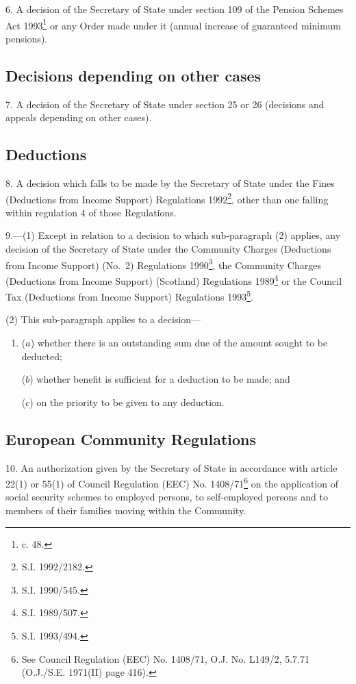 \documentclass[12pt,a4paper]{article}
\begin{document}
6.  A decision of the Secretary of State under section 109 of the Pension Schemes Act 1993\footnote{ c. 48.} or any Order made under it (annual increase of guaranteed minimum pensions).

\subsection*{Decisions depending on other cases}

7.  A decision of the Secretary of State under section 25 or 26 (decisions and appeals depending on other cases).

\subsection*{Deductions}

8.  A decision which falls to be made by the Secretary of State under the Fines (Deductions from Income Support) Regulations 1992\footnote{\frenchspacing S.I. 1992/2182.}, other than one falling within regulation 4 of those Regulations.

\medskip

9.—(1) Except in relation to a decision to which sub-paragraph (2) applies, any decision of the Secretary of State under the Community Charges (Deductions from Income Support) (No.\ 2) Regulations 1990\footnote{\frenchspacing S.I. 1990/545.}, the Community Charges (Deductions from Income Support) (Scotland) Regulations 1989\footnote{\frenchspacing S.I. 1989/507.} or the Council Tax (Deductions from Income Support) Regulations 1993\footnote{\frenchspacing S.I. 1993/494.}.

(2) This sub-paragraph applies to a decision—
\begin{enumerate}\item[]
($a$) whether there is an outstanding sum due of the amount sought to be deducted;

($b$) whether benefit is sufficient for a deduction to be made; and

($c$) on the priority to be given to any deduction.
\end{enumerate}

\subsection*{European Community Regulations}

10.  An authorization given by the Secretary of State in accordance with article 22(1) or 55(1) of Council Regulation (EEC) No. 1408/71\footnote{\frenchspacing See Council Regulation (EEC) No. 1408/71, O.J. No. L149/2, 5.7.71 (O.J./S.E. 1971(II) page 416).} on the application of social security schemes to employed persons, to self-employed persons and to members of their families moving within the Community.
\end{document}
